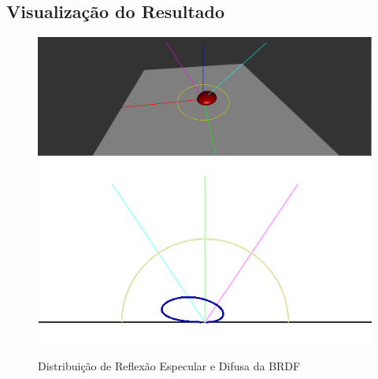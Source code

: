 \subsection{Visualização do Resultado}
\begin{figure}[H]
    \caption{\small{Distribuição de Reflexão Especular e Difusa da BRDF}}\label{fig-duer-plots}
    \vspace{42px}
  \includegraphics[width=\linewidth]{./Imagens/brdfs/duer-3D-plot}
\endminipage\hfill
{}
  \includegraphics[width=\linewidth]{./Imagens/brdfs/duer-polar-plot.png}
\endminipage\hfill
\end{figure}

